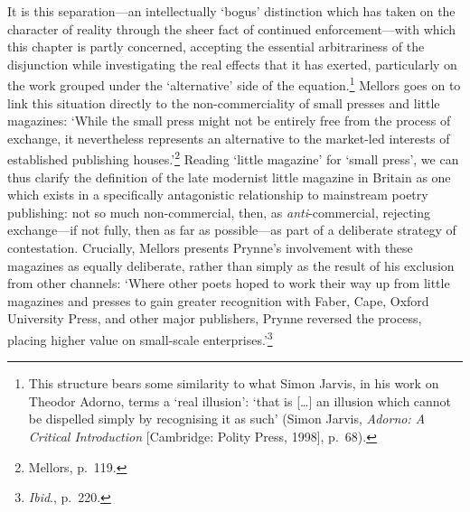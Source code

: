 \documentclass[]{article}
\begin{document}
\noindent It is this separation—an intellectually ‘bogus’ distinction
which has taken on the character of reality through the sheer fact of
continued enforcement—with which this chapter is partly concerned,
accepting the essential arbitrariness of the disjunction while
investigating the real effects that it has exerted, particularly on the
work grouped under the ‘alternative’ side of the equation.\footnote{This
  structure bears some similarity to what Simon Jarvis, in his work on
  Theodor Adorno, terms a ‘real illusion’: ‘that is {[}\ldots{}{]} an
  illusion which cannot be dispelled simply by recognising it as such’
  (Simon Jarvis, \emph{Adorno: A Critical Introduction} {[}Cambridge:
  Polity Press, 1998{]}, p.~68).} Mellors goes on to link this situation
directly to the non-commerciality of small presses and little magazines:
‘While the small press might not be entirely free from the process of
exchange, it nevertheless represents an alternative to the market-led
interests of established publishing houses.’\footnote{Mellors, p.~119.}
Reading ‘little magazine’ for ‘small press’, we can thus clarify the
definition of the late modernist little magazine in Britain as one which
exists in a specifically antagonistic relationship to mainstream poetry
publishing: not so much non-commercial, then, as \emph{anti}-commercial,
rejecting exchange—if not fully, then as far as possible—as part of a
deliberate strategy of contestation. Crucially, Mellors presents
Prynne’s involvement with these magazines as equally deliberate, rather
than simply as the result of his exclusion from other channels: ‘Where
other poets hoped to work their way up from little magazines and presses
to gain greater recognition with Faber, Cape, Oxford University Press,
and other major publishers, Prynne reversed the process, placing higher
value on small-scale enterprises.’\footnote{\emph{Ibid}., p.~220.}
\end{document}
